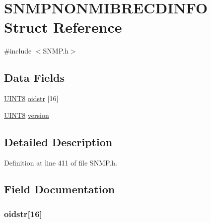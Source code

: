 \hypertarget{struct_s_n_m_p_n_o_n_m_i_b_r_e_c_d_i_n_f_o}{}\section{S\+N\+M\+P\+N\+O\+N\+M\+I\+B\+R\+E\+C\+D\+I\+N\+F\+O Struct Reference}
\label{struct_s_n_m_p_n_o_n_m_i_b_r_e_c_d_i_n_f_o}


{\ttfamily \#include $<$S\+N\+M\+P.\+h$>$}

\subsection*{Data Fields}
\begin{DoxyCompactItemize}
\item 
\hyperlink{_generic_type_defs_8h_ab27e9918b538ce9d8ca692479b375b6a}{U\+I\+N\+T8} \hyperlink{struct_s_n_m_p_n_o_n_m_i_b_r_e_c_d_i_n_f_o_a21cf0a24cd6de6b3b1708f51f5f3f1f6}{oidstr} \mbox{[}16\mbox{]}
\item 
\hyperlink{_generic_type_defs_8h_ab27e9918b538ce9d8ca692479b375b6a}{U\+I\+N\+T8} \hyperlink{struct_s_n_m_p_n_o_n_m_i_b_r_e_c_d_i_n_f_o_ac7d72c643c27497c3c55313c620a2f25}{version}
\end{DoxyCompactItemize}


\subsection{Detailed Description}


Definition at line 411 of file S\+N\+M\+P.\+h.



\subsection{Field Documentation}
\hypertarget{struct_s_n_m_p_n_o_n_m_i_b_r_e_c_d_i_n_f_o_a21cf0a24cd6de6b3b1708f51f5f3f1f6}{}
\subsubsection[{oidstr}]{ oidstr\mbox{[}16\mbox{]}}\label{struct_s_n_m_p_n_o_n_m_i_b_r_e_c_d_i_n_f_o_a21cf0a24cd6de6b3b1708f51f5f3f1f6}


